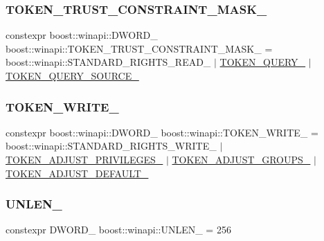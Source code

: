 \subsubsection{\texorpdfstring{T\+O\+K\+E\+N\+\_\+\+T\+R\+U\+S\+T\+\_\+\+C\+O\+N\+S\+T\+R\+A\+I\+N\+T\+\_\+\+M\+A\+S\+K\+\_\+}{TOKEN\_TRUST\_CONSTRAINT\_MASK\_}}
{\footnotesize\ttfamily constexpr boost\+::winapi\+::\+D\+W\+O\+R\+D\+\_\+ boost\+::winapi\+::\+T\+O\+K\+E\+N\+\_\+\+T\+R\+U\+S\+T\+\_\+\+C\+O\+N\+S\+T\+R\+A\+I\+N\+T\+\_\+\+M\+A\+S\+K\+\_\+ = boost\+::winapi\+::\+S\+T\+A\+N\+D\+A\+R\+D\+\_\+\+R\+I\+G\+H\+T\+S\+\_\+\+R\+E\+A\+D\+\_\+ $\vert$ \mbox{\hyperlink{namespaceboost_1_1winapi_aa8d690e5577abdf2d156cbcda5cf23fb}{T\+O\+K\+E\+N\+\_\+\+Q\+U\+E\+R\+Y\+\_\+}} $\vert$ \mbox{\hyperlink{namespaceboost_1_1winapi_af504352b775da9ed41d3e8d451fb60b2}{T\+O\+K\+E\+N\+\_\+\+Q\+U\+E\+R\+Y\+\_\+\+S\+O\+U\+R\+C\+E\+\_\+}}}

\mbox{\label{namespaceboost_1_1winapi_aa3759e68597b280f97ab3f8c467ece85}} 
\subsubsection{\texorpdfstring{T\+O\+K\+E\+N\+\_\+\+W\+R\+I\+T\+E\+\_\+}{TOKEN\_WRITE\_}}
{\footnotesize\ttfamily constexpr boost\+::winapi\+::\+D\+W\+O\+R\+D\+\_\+ boost\+::winapi\+::\+T\+O\+K\+E\+N\+\_\+\+W\+R\+I\+T\+E\+\_\+ = boost\+::winapi\+::\+S\+T\+A\+N\+D\+A\+R\+D\+\_\+\+R\+I\+G\+H\+T\+S\+\_\+\+W\+R\+I\+T\+E\+\_\+ $\vert$ \mbox{\hyperlink{namespaceboost_1_1winapi_ae421c93ef942bc0c7728ecd495a19208}{T\+O\+K\+E\+N\+\_\+\+A\+D\+J\+U\+S\+T\+\_\+\+P\+R\+I\+V\+I\+L\+E\+G\+E\+S\+\_\+}} $\vert$ \mbox{\hyperlink{namespaceboost_1_1winapi_a5bceb0371395d6c4af2c6fd537a9df1c}{T\+O\+K\+E\+N\+\_\+\+A\+D\+J\+U\+S\+T\+\_\+\+G\+R\+O\+U\+P\+S\+\_\+}} $\vert$ \mbox{\hyperlink{namespaceboost_1_1winapi_a392915600d4ba82203d0ac72f10e8563}{T\+O\+K\+E\+N\+\_\+\+A\+D\+J\+U\+S\+T\+\_\+\+D\+E\+F\+A\+U\+L\+T\+\_\+}}}

\mbox{\label{namespaceboost_1_1winapi_a95679cb78557bc41725c551f27cd7de7}} 
\subsubsection{\texorpdfstring{U\+N\+L\+E\+N\+\_\+}{UNLEN\_}}
{\footnotesize\ttfamily constexpr D\+W\+O\+R\+D\+\_\+ boost\+::winapi\+::\+U\+N\+L\+E\+N\+\_\+ = 256}

